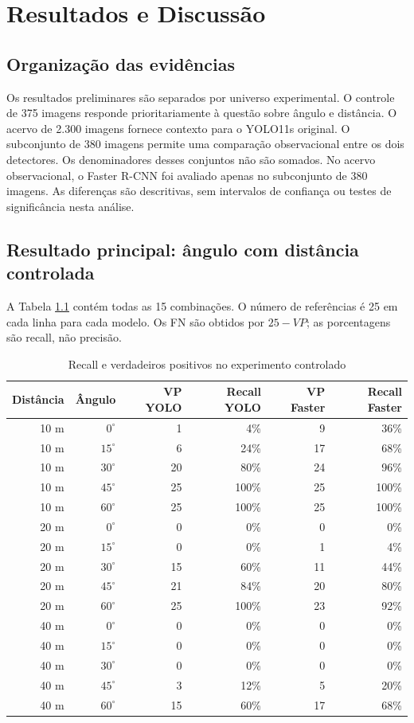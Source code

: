 \chapter{Resultados e Discussão}
\section{Organização das evidências}
Os resultados preliminares são separados por universo experimental. O controle de 375 imagens responde prioritariamente à questão sobre ângulo e distância. O acervo de 2.300 imagens fornece contexto para o YOLO11s original. O subconjunto de 380 imagens permite uma comparação observacional entre os dois detectores. Os denominadores desses conjuntos não são somados. No acervo observacional, o Faster R-CNN foi avaliado apenas no subconjunto de 380 imagens. As diferenças são descritivas, sem intervalos de confiança ou testes de significância nesta análise.

\section{Resultado principal: ângulo com distância controlada}
A Tabela \ref{tab:recall-celulas} contém todas as 15 combinações. O número de referências é 25 em cada linha para cada modelo. Os FN são obtidos por $25-VP$; as porcentagens são recall, não precisão.
\begin{table}[htb]
\caption{Recall e verdadeiros positivos no experimento controlado}
\label{tab:recall-celulas}\centering\small
\begin{tabular}{rr r r r r}
\hline Distância & Ângulo & VP YOLO & Recall YOLO & VP Faster & Recall Faster\\\hline
10 m & $0^\circ$ & 1 & 4\% & 9 & 36\%\\
10 m & $15^\circ$ & 6 & 24\% & 17 & 68\%\\
10 m & $30^\circ$ & 20 & 80\% & 24 & 96\%\\
10 m & $45^\circ$ & 25 & 100\% & 25 & 100\%\\
10 m & $60^\circ$ & 25 & 100\% & 25 & 100\%\\\hline
20 m & $0^\circ$ & 0 & 0\% & 0 & 0\%\\
20 m & $15^\circ$ & 0 & 0\% & 1 & 4\%\\
20 m & $30^\circ$ & 15 & 60\% & 11 & 44\%\\
20 m & $45^\circ$ & 21 & 84\% & 20 & 80\%\\
20 m & $60^\circ$ & 25 & 100\% & 23 & 92\%\\\hline
40 m & $0^\circ$ & 0 & 0\% & 0 & 0\%\\
40 m & $15^\circ$ & 0 & 0\% & 0 & 0\%\\
40 m & $30^\circ$ & 0 & 0\% & 0 & 0\%\\
40 m & $45^\circ$ & 3 & 12\% & 5 & 20\%\\
40 m & $60^\circ$ & 15 & 60\% & 17 & 68\%\\\hline
\end{tabular}
\end{table}

